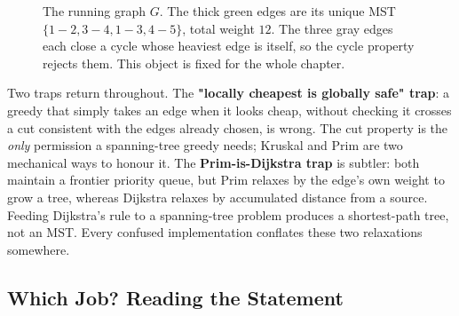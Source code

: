 \begin{figure}[H]
\centering
{}
\caption{The running graph \(G\).  The thick green edges are its unique MST
\(\{1\!-\!2,3\!-\!4,1\!-\!3,4\!-\!5\}\), total weight \(12\).  The three gray edges
each close a cycle whose heaviest edge is itself, so the cycle property rejects
them.  This object is fixed for the whole chapter.}
\label{fig:c17-tree}
\end{figure}

Two traps return throughout.  The \textbf{"locally cheapest is globally safe"
trap}: a greedy that simply takes an edge when it looks cheap, without checking
it crosses a cut consistent with the edges already chosen, is wrong.  The cut
property is the \emph{only} permission a spanning-tree greedy needs; Kruskal and
Prim are two mechanical ways to honour it.  The \textbf{Prim-is-Dijkstra trap}
is subtler: both maintain a frontier priority queue, but Prim relaxes by the
edge's own weight to grow a tree, whereas Dijkstra relaxes by accumulated
distance from a source.  Feeding Dijkstra's rule to a spanning-tree problem
produces a shortest-path tree, not an MST.  Every confused implementation
conflates these two relaxations somewhere.

\subsection*{Which Job? Reading the Statement}

